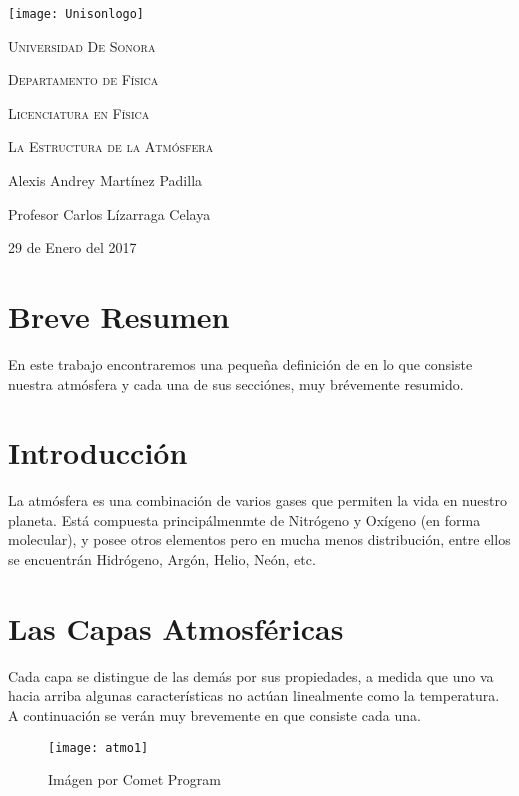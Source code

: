 \documentclass{article}
\begin{document}
\begin{titlepage}
	\centering
	\texttt{[image: Unisonlogo]}\par
    \vspace{1.3cm}
	\scshape \LARGE Universidad De Sonora \par
	\vspace{1cm}
	\scshape \Large Departamento de Física\par
    \scshape \Large Licenciatura en Física \par
	\vspace{1.5cm}
	\huge \scshape La Estructura de la Atmósfera\par
	\vspace{2cm}
	\Large Alexis Andrey Martínez Padilla\par
    \Large Profesor Carlos Lízarraga Celaya\par
    \vspace{2.5cm}
    \Large 29 de Enero del 2017
\end{titlepage}

\section{Breve Resumen}
    En este trabajo encontraremos una pequeña definición de en lo que consiste nuestra atmósfera y cada una de sus secciónes, muy brévemente resumido.

\section{Introducción}
    La atmósfera es una combinación de varios gases que permiten la vida en nuestro planeta. Está compuesta principálmenmte de Nitrógeno y Oxígeno (en forma molecular), y posee otros elementos pero en mucha menos distribución, entre ellos se encuentrán Hidrógeno, Argón, Helio, Neón, etc.
    
\section{Las Capas Atmosféricas}
    Cada capa se distingue de las demás por sus propiedades, a medida que uno va hacia arriba algunas características no actúan linealmente como la temperatura. A continuación se verán muy brevemente en que consiste cada una.

\begin{figure}[ht!]
\centering
\texttt{[image: atmo1]}
\caption{Imágen por Comet Program \label{overflow}}
\end{figure}
\end{document}
